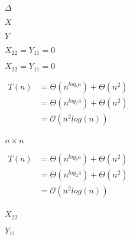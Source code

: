 \documentclass[10pt]{book}
\begin{document}
\begin{mdSnippets}
\begin{mdInlineSnippet}[967878d1da852d4b07a961e3168b0fff]
$\Delta$\end{mdInlineSnippet}%
\begin{mdInlineSnippet}[02129bb861061d1a052c592e2dc6b383]%
$X$\end{mdInlineSnippet}%
\begin{mdInlineSnippet}[57cec4137b614c87cb4e24a3d003a3e0]%
$Y$\end{mdInlineSnippet}%
\begin{mdInlineSnippet}[3afeaf2272b42c62136c2e8e1f11d5ff]%
$X_{22} = Y_{11} = 0$\end{mdInlineSnippet}%
\begin{mdInlineSnippet}[3afeaf2272b42c62136c2e8e1f11d5ff]%
$X_{22} = Y_{11} = 0$\end{mdInlineSnippet}%
\begin{mdInlineSnippet}[c3eb828de624f1cd03083f9a7bb7a45d]%
$\begin{aligned}T(n) &= \Theta(n^{log_{b} a}) + \Theta(n^{2})\\   &= \Theta(n^{log_{2} 4}) + \Theta(n^{2})\\&= \mathcal{O}{(n^{2}log(n))}\\\end{aligned} $\end{mdInlineSnippet}%
\begin{mdInlineSnippet}[50f17e5c11d610b19c0471830dc4dda1]%
$n \times n$\end{mdInlineSnippet}%
\begin{mdInlineSnippet}[c3eb828de624f1cd03083f9a7bb7a45d]%
$\begin{aligned}T(n) &= \Theta(n^{log_{b} a}) + \Theta(n^{2})\\   &= \Theta(n^{log_{2} 4}) + \Theta(n^{2})\\&= \mathcal{O}{(n^{2}log(n))}\\\end{aligned} $\end{mdInlineSnippet}%
\begin{mdInlineSnippet}[6251022e6652340cba75729f50fe6b30]%
$X_{22}$\end{mdInlineSnippet}%
\begin{mdInlineSnippet}%
$Y_{11}$\end{mdInlineSnippet}%
\begin{mdInlineSnippet}[b6d01a2fdafa4e4f742209c8777020a0]%

\end{mdInlineSnippet}
\end{mdSnippets}
\end{document}
